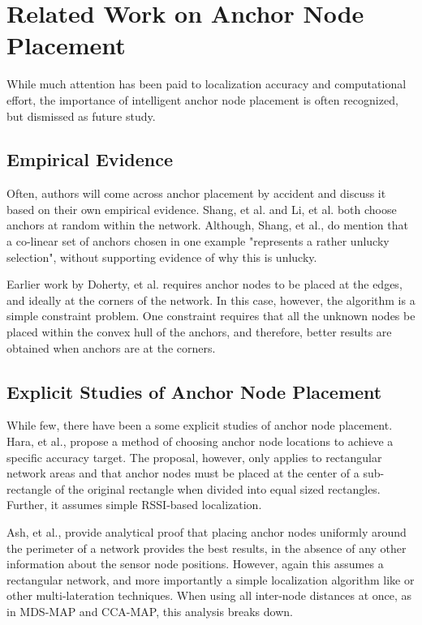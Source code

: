 \chapter{Related Work on Anchor Node Placement}
\label{chap:RelatedWork}
While much attention has been paid to localization accuracy and computational effort, the importance of intelligent anchor node placement is often recognized, but dismissed as future study.

\section{Empirical Evidence}
\label{sec:RelatedWorkEmpirical}
Often, authors will come across anchor placement by accident and discuss it based on their own empirical evidence.  Shang, et al.\cite[p.964]{MDS-MAP} and Li, et al.\cite[p.11]{CCA-MAP07} both choose anchors at random within the network.  Although, Shang, et al., do mention that a co-linear set of anchors chosen in one example "represents a rather unlucky selection", without supporting evidence of why this is unlucky.

Earlier work by Doherty, et al.\cite{Doherty} requires anchor nodes to be placed at the edges, and ideally at the corners of the network.  In this case, however, the algorithm is a simple constraint problem.  One constraint requires that all the unknown nodes be placed within the convex hull of the anchors, and therefore, better results are obtained when anchors are at the corners.

\section{Explicit Studies of Anchor Node Placement}
While few, there have been a some explicit studies of anchor node placement.  Hara, et al.\cite{Hara}, propose a method of choosing anchor node locations to achieve a specific accuracy target.  The proposal, however, only applies to rectangular network areas and that anchor nodes must be placed at the center of a sub-rectangle of the original rectangle when divided into equal sized rectangles.  Further, it assumes simple RSSI-based localization.  

Ash, et al.\cite{Ash}, provide analytical proof that placing anchor nodes uniformly around the perimeter of a network provides the best results, in the absence of any other information about the sensor node positions. However, again this assumes a rectangular network, and more importantly a simple localization algorithm like \cite{Doherty} or other multi-lateration techniques.  When using all inter-node distances at once, as in MDS-MAP and CCA-MAP, this analysis breaks down.

